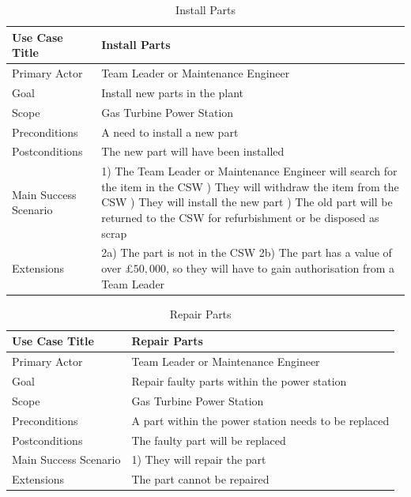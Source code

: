 \begin{table}[]
	\centering
	\caption{Install Parts}
	\label{Install-Parts}
	\begin{tabularx}{\textwidth}{| l | X |}
		\hline
		Use Case Title	&  Install Parts\\ \hline \hline
		Primary Actor	&  Team Leader or Maintenance Engineer \\ \hline
		Goal	&  Install new parts in the plant\\ \hline
		Scope	&  Gas Turbine Power Station\\ \hline
		Preconditions	&  A need to install a new part\\ \hline
		Postconditions	&  The new part will have been installed\\ \hline
		Main Success Scenario	&  
		1) The Team Leader or Maintenance Engineer will search for the item in the CSW \newline
		2) They will withdraw the item from the CSW \newline
		3) They will install the new part \newline
		4) The old part will be returned to the CSW for refurbishment or be disposed as scrap 
		\\ \hline
		Extensions	&  2a) The part is not in the CSW \newline 2b) The part has a value of over \pounds$50,000$, so they will have to gain authorisation from a Team Leader \\ \hline
	\end{tabularx}
\end{table}

\begin{table}[]
	\centering
	\caption{Repair Parts}
	\label{Repair-Parts}
	\begin{tabularx}{\textwidth}{| l | X |}
		\hline
		Use Case Title	&  Repair Parts\\ \hline \hline
		Primary Actor	&  Team Leader or Maintenance Engineer\\ \hline
		Goal	&  Repair faulty parts within the power station\\ \hline
		Scope	&  Gas Turbine Power Station \\ \hline
		Preconditions	&  A part within the power station needs to be replaced \\ \hline
		Postconditions	&  The faulty part will be replaced \\ \hline
		Main Success Scenario	&  
		1) They will repair the part
		\\ \hline
		Extensions	&  The part cannot be repaired \\ \hline
	\end{tabularx}
\end{table}

